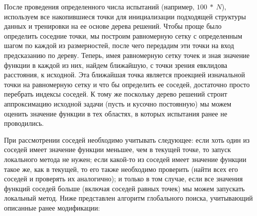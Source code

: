 \documentclass[12pt, a4paper, russian]{article}
\begin{document}
После проведения определенного числа испытаний (например, $100\ \ast\ N$), используем все накопившиеся точки для инициализации подходящей структуры данных и тренировки на ее основе дерева решений. Чтобы проще было определить соседние точки, мы построим равномерную сетку с определенным шагом по каждой из размерностей, после чего передадим эти точки на вход предсказанию по дереву. Теперь, имея равномерную сетку точек и зная значение функции в каждой из них, найдем ближайшую, с точки зрения евклидова расстояния, к исходной. Эта ближайшая точка является проекцией изначальной точки на равномерную сетку и что бы определить  ее соседей, достаточно  просто перебрать индексы соседей. К тому же поскольку дерево решений строит аппроксимацию исходной задачи (пусть и кусочно постоянную) мы можем оценить значение функции в тех областях, в которых испытания ранее не проводились.

При рассмотрении соседей необходимо учитывать следующее: если хоть один из соседей имеет значение функции меньшее, чем в текущей точке, то запуск локального метода не нужен; если какой-то из соседей имеет значение функции такое же, как в текущей, то его также необходимо проверить (найти всех его соседей и проверять их аналогично); и только в том случае, если все значения функций соседей больше (включая соседей равных точек) мы можем запускать локальный метод. Ниже представлен алгоритм глобального поиска, учитывающий описанные ранее модификации:
\end{document}
